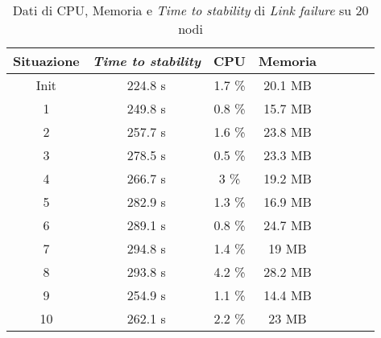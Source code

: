     \begin{table}[H]
    \caption{Dati di CPU, Memoria e \textit{Time to stability} di \textit{Link failure} su 20 nodi}
    \label{tab:LF20}
    \begin{center}
        \begin{tabular}{|c|c|c|c|c|c|c|c|}
            \hline
            Situazione & \textit{Time to stability} & CPU & Memoria\\
            \hline
            Init & 224.8 s & 1.7 \% & 20.1 MB\\
            1    & 249.8 s  & 0.8  \% & 15.7 MB\\
            2    & 257.7 s  & 1.6  \% & 23.8 MB\\
            3    & 278.5 s  & 0.5 \%  & 23.3 MB\\
            4    & 266.7 s  & 3   \%  & 19.2 MB\\
            5    & 282.9 s  & 1.3 \%  & 16.9 MB\\
            6    & 289.1 s  & 0.8 \%  & 24.7 MB\\
            7    & 294.8 s  & 1.4 \%  & 19   MB\\
            8    & 293.8 s  & 4.2 \%  & 28.2 MB\\
            9    & 254.9 s  & 1.1 \%  & 14.4 MB\\
            10   & 262.1 s  & 2.2 \%  & 23   MB\\
            \hline
        \end{tabular}
        \end{center}
    \end{table}
    
